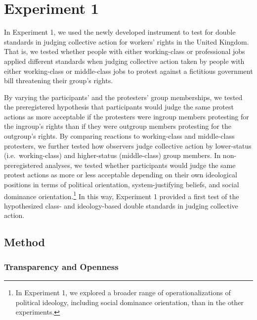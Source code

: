 \documentclass[12pt, letterpaper]{article}
\begin{document}
\hypertarget{experiment-1}{%
\section{Experiment 1}\label{experiment-1}}

In Experiment 1, we used the newly developed instrument to test for
double standards in judging collective action for workers' rights in the
United Kingdom. That is, we tested whether people with either
working-class or professional jobs applied different standards when
judging collective action taken by people with either working-class or
middle-class jobs to protest against a fictitious government bill
threatening their group's rights.

By varying the participants' and the protesters' group memberships, we
tested the preregistered hypothesis that participants would judge the
same protest actions as more acceptable if the protesters were ingroup
members protesting for the ingroup's rights than if they were outgroup
members protesting for the outgroup's rights. By comparing reactions to
working-class and middle-class protesters, we further tested how
observers judge collective action by lower-status (i.e.~working-class)
and higher-status (middle-class) group members. In non-preregistered
analyses, we tested whether participants would judge the same protest
actions as more or less acceptable depending on their own ideological
positions in terms of political orientation, system-justifying beliefs,
and social dominance orientation.\footnote{In Experiment 1, we explored
  a broader range of operationalizations of political ideology,
  including social dominance orientation, than in the other experiments.}
In this way, Experiment 1 provided a first test of the hypothesized
class- and ideology-based double standards in judging collective action.

\hypertarget{method}{%
\subsection{Method}\label{method}}

\hypertarget{transparency-and-openness}{%
\subsubsection{Transparency and
Openness}\label{transparency-and-openness}}
\end{document}
